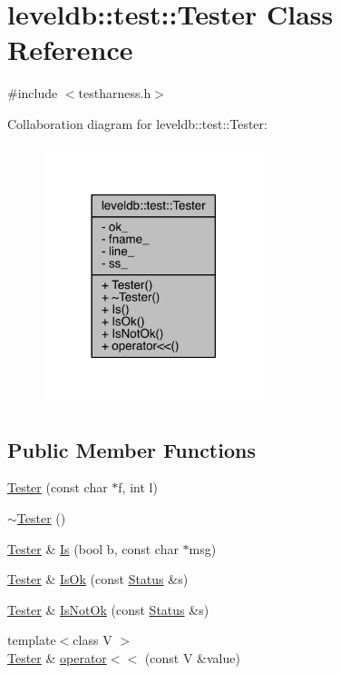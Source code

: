 \hypertarget{classleveldb_1_1test_1_1_tester}{}\section{leveldb\+:\+:test\+:\+:Tester Class Reference}
\label{classleveldb_1_1test_1_1_tester}


{\ttfamily \#include $<$testharness.\+h$>$}



Collaboration diagram for leveldb\+:\+:test\+:\+:Tester\+:\nopagebreak
\begin{figure}[H]
\begin{center}
\leavevmode
\includegraphics[width=182pt]{classleveldb_1_1test_1_1_tester__coll__graph}
\end{center}
\end{figure}
\subsection*{Public Member Functions}
\begin{DoxyCompactItemize}
\item 
\hyperlink{classleveldb_1_1test_1_1_tester_a166bc7b18483780292a44425ef5e64f7}{Tester} (const char $\ast$f, int l)
\item 
\hyperlink{classleveldb_1_1test_1_1_tester_a832d52d6aa29945cccdf762b54481295}{$\sim$\+Tester} ()
\item 
\hyperlink{classleveldb_1_1test_1_1_tester}{Tester} \& \hyperlink{classleveldb_1_1test_1_1_tester_ad75cd5ea132083b72e7fd7271ef1918a}{Is} (bool b, const char $\ast$msg)
\item 
\hyperlink{classleveldb_1_1test_1_1_tester}{Tester} \& \hyperlink{classleveldb_1_1test_1_1_tester_af0e4decc6f483a78af44926634d990c2}{Is\+Ok} (const \hyperlink{classleveldb_1_1_status}{Status} \&s)
\item 
\hyperlink{classleveldb_1_1test_1_1_tester}{Tester} \& \hyperlink{classleveldb_1_1test_1_1_tester_a5374b6b28e0aee8ceeb92c1ec42fa4d6}{Is\+Not\+Ok} (const \hyperlink{classleveldb_1_1_status}{Status} \&s)
\item 
{\footnotesize template$<$class V $>$ }\\\hyperlink{classleveldb_1_1test_1_1_tester}{Tester} \& \hyperlink{classleveldb_1_1test_1_1_tester_a4e776d487df19ac9daeed5527cd1d80e}{operator$<$$<$} (const V \&value)
\end{DoxyCompactItemize}
